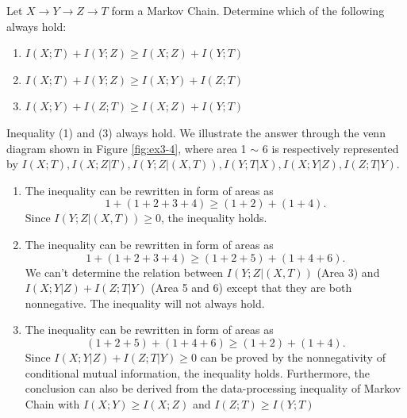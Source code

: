 \begin{exercise}[]{Let $X \rightarrow Y \rightarrow Z \rightarrow T$ form a Markov Chain. Determine which of the following always hold:
  \begin{enumerate}
    \item $I(X;T)+I(Y;Z) \ge I(X;Z)+I(Y;T)$
    \item $I(X;T)+I(Y;Z) \ge I(X;Y)+I(Z;T)$
    \item $I(X;Y)+I(Z;T) \ge I(X;Z)+I(Y;T)$
  \end{enumerate}
}
  \begin{solution}
    Inequality (1) and (3) always hold. We illustrate the answer through the venn diagram shown in Figure \ref{fig:ex3-4}, where area 1 $\sim$ 6 is respectively represented by $I(X;T),I(X;Z|T),I(Y;Z|(X,T)),I(Y;T|X),I(X;Y|Z),I(Z;T|Y)$.
    \begin{enumerate}
      \item {
        The inequality can be rewritten in form of areas as
        $$1+(1+2+3+4)\ge (1+2)+(1+4).$$
        Since $I(Y;Z|(X,T))\ge 0$, the inequality holds.
      }
      \item {
        The inequality can be rewritten in form of areas as
        $$1+(1+2+3+4)\ge (1+2+5)+(1+4+6).$$
        We can't determine the relation between $I(Y;Z|(X,T))$ (Area 3) and $I(X;Y|Z)+I(Z;T|Y)$ (Area 5 and 6) except that they are both nonnegative. The inequality will not always hold.
      }
      \item {
        The inequality can be rewritten in form of areas as
        $$(1+2+5)+(1+4+6)\ge (1+2)+(1+4).$$
        Since $I(X;Y|Z)+I(Z;T|Y) \ge 0$ can be proved by the nonnegativity of conditional mutual information, the inequality holds.
        Furthermore, the conclusion can also be derived from the data-processing inequality of Markov Chain with $I(X;Y)\ge I(X;Z)$ and $I(Z;T)\ge I(Y;T)$
      }
    \end{enumerate}
  \end{solution}
\end{exercise}



